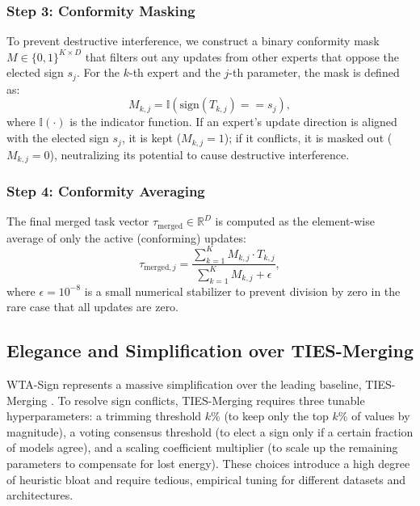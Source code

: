 \subsubsection{Step 3: Conformity Masking}
To prevent destructive interference, we construct a binary conformity mask $M \in \{0, 1\}^{K \times D}$ that filters out any updates from other experts that oppose the elected sign $s_j$.
For the $k$-th expert and the $j$-th parameter, the mask is defined as:
\begin{equation}
    M_{k, j} = \mathbb{I}\left( \text{sign}\left( T_{k, j} \right) == s_j \right),
\end{equation}
where $\mathbb{I}(\cdot)$ is the indicator function.
If an expert's update direction is aligned with the elected sign $s_j$, it is kept ($M_{k, j} = 1$); if it conflicts, it is masked out ($M_{k, j} = 0$), neutralizing its potential to cause destructive interference.

\subsubsection{Step 4: Conformity Averaging}
The final merged task vector $\tau_{\text{merged}} \in \mathbb{R}^D$ is computed as the element-wise average of only the active (conforming) updates:
\begin{equation}
    \tau_{\text{merged}, j} = \frac{\sum_{k=1}^K M_{k, j} \cdot T_{k, j}}{\sum_{k=1}^K M_{k, j} + \epsilon},
\end{equation}
where $\epsilon = 10^{-8}$ is a small numerical stabilizer to prevent division by zero in the rare case that all updates are zero.

\subsection{Elegance and Simplification over TIES-Merging}
WTA-Sign represents a massive simplification over the leading baseline, \mbox{TIES-Merging} \cite{yadav2023ties}.
To resolve sign conflicts, TIES-Merging requires three tunable hyperparameters: a trimming threshold $k\%$ (to keep only the top $k\%$ of values by magnitude), a voting consensus threshold (to elect a sign only if a certain fraction of models agree), and a scaling coefficient multiplier (to scale up the remaining parameters to compensate for lost energy).
These choices introduce a high degree of heuristic bloat and require tedious, empirical tuning for different datasets and architectures.


